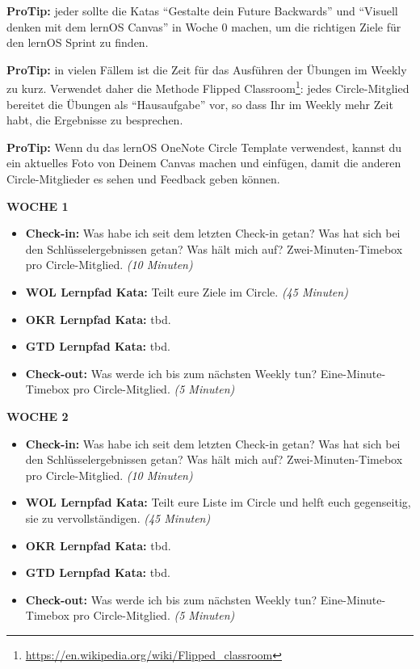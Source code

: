 \documentclass[
  ngerman,
  paper=a4,
,captions=tableheading
]{scrartcl}
\DeclareRobustCommand{\href}[2]{#2\footnote{\url{#1}}}
\providecommand{\tightlist}{%
  \setlength{\itemsep}{0pt}\setlength{\parskip}{0pt}}
\begin{document}
\textbf{ProTip:} jeder sollte die Katas ``Gestalte dein Future
Backwards'' und ``Visuell denken mit dem lernOS Canvas'' in Woche 0
machen, um die richtigen Ziele für den lernOS Sprint zu finden.

\textbf{ProTip:} in vielen Fällem ist die Zeit für das Ausführen der
Übungen im Weekly zu kurz. Verwendet daher die Methode
\href{https://en.wikipedia.org/wiki/Flipped_classroom}{Flipped
Classroom}: jedes Circle-Mitglied bereitet die Übungen als
``Hausaufgabe'' vor, so dass Ihr im Weekly mehr Zeit habt, die
Ergebnisse zu besprechen.

\textbf{ProTip:} Wenn du das lernOS OneNote Circle Template verwendest,
kannst du ein aktuelles Foto von Deinem Canvas machen und einfügen,
damit die anderen Circle-Mitglieder es sehen und Feedback geben können.

\textbf{WOCHE 1}

\begin{itemize}
\tightlist
\item
  \textbf{Check-in:} Was habe ich seit dem letzten Check-in getan? Was
  hat sich bei den Schlüsselergebnissen getan? Was hält mich auf?
  Zwei-Minuten-Timebox pro Circle-Mitglied. \emph{(10 Minuten)}
\item
  \textbf{WOL Lernpfad Kata:} Teilt eure Ziele im Circle. \emph{(45
  Minuten)}
\item
  \textbf{OKR Lernpfad Kata:} tbd.
\item
  \textbf{GTD Lernpfad Kata:} tbd.
\item
  \textbf{Check-out:} Was werde ich bis zum nächsten Weekly tun?
  Eine-Minute-Timebox pro Circle-Mitglied. \emph{(5 Minuten)}
\end{itemize}

\textbf{WOCHE 2}

\begin{itemize}
\tightlist
\item
  \textbf{Check-in:} Was habe ich seit dem letzten Check-in getan? Was
  hat sich bei den Schlüsselergebnissen getan? Was hält mich auf?
  Zwei-Minuten-Timebox pro Circle-Mitglied. \emph{(10 Minuten)}
\item
  \textbf{WOL Lernpfad Kata:} Teilt eure Liste im Circle und helft euch
  gegenseitig, sie zu vervollständigen. \emph{(45 Minuten)}
\item
  \textbf{OKR Lernpfad Kata:} tbd.
\item
  \textbf{GTD Lernpfad Kata:} tbd.
\item
  \textbf{Check-out:} Was werde ich bis zum nächsten Weekly tun?
  Eine-Minute-Timebox pro Circle-Mitglied. \emph{(5 Minuten)}
\end{itemize}
\end{document}

